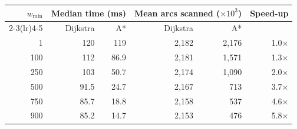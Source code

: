 \begin{tabular}{rrrrrr}
\toprule
$w_{\min}$ & \multicolumn{2}{c}{Median time (ms)} & \multicolumn{2}{c}{Mean arcs scanned ($\times 10^3$)} & Speed-up \\
\cmidrule(lr){2-3}\cmidrule(lr){4-5}
 & Dijkstra & A* & Dijkstra & A* & \\
\midrule
1 & 120 & 119 & 2{,}182 & 2{,}176 & 1.0$\times$ \\
100 & 112 & 86.9 & 2{,}181 & 1{,}571 & 1.3$\times$ \\
250 & 103 & 50.7 & 2{,}174 & 1{,}090 & 2.0$\times$ \\
500 & 91.5 & 24.7 & 2{,}167 & 713 & 3.7$\times$ \\
750 & 85.7 & 18.8 & 2{,}158 & 537 & 4.6$\times$ \\
900 & 85.2 & 14.7 & 2{,}153 & 476 & 5.8$\times$ \\
\bottomrule
\end{tabular}
